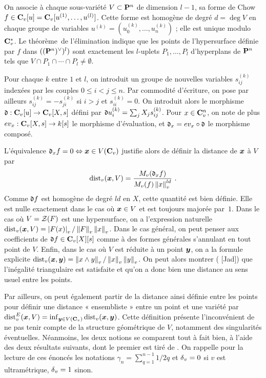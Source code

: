 \documentclass{mpg-preth}
\begin{document}
On associe à chaque sous-variété $V \subset \mathbf{P}^n$ de dimension $l-1$, sa
forme de Chow $f \in \mathbf{C}_v[u] = \mathbf{C}_v[u^{(1)}, \dots, u^{(l)}]$. Cette forme est
homogène de degré $d = \deg V$ en chaque groupe de variables $u^{(k)} =
(u^{(k)}_0, \dots, u^{(k)}_n)$ ; elle est unique modulo $\mathbf{C}_v^{*}$. Le
théorème~de l'élimination indique que les points de l'hypersurface définie par
$f$ dans $((\mathbf{P}^n)^\vee)^l)$ sont exactement les $l$-uplets $P_1, \dots,
P_l$ d'hyperplans de $\mathbf{P}^n$ tels que $V \cap P_1 \cap \cdots \cap P_l \neq
\emptyset$.

Pour chaque $k$ entre $1$ et $l$, on introduit un groupe de nouvelles
variables $s^{(k)}_{ij}$ indexées par les couples $0 \le i < j \le n$. Par
commodité d'écriture, on pose par ailleurs $s^{(k)}_{ij} = - s^{(k)}_{ji}$ si
$i > j$ et $s^{(k)}_{ii} = 0$. On introduit alors le morphisme $\mathfrak{d} : \mathbf{C}_v[u]
\to \mathbf{C}_v[X, s]$ défini par $\mathfrak{d} u^{(k)}_i = \sum_j X_j s^{(k)}_{ij}$. Pour $x
\in \mathbf{C}_v^n$, on note de plus $ev_x : \mathbf{C}_v[X, s] \to k[s]$ le morphisme
d'évaluation, et $\mathfrak{d}_x = ev_x \circ \mathfrak{d}$ le morphisme composé.

L'équivalence $\mathfrak{d}_x f = 0 \Leftrightarrow \boldsymbol{x} \in V(\mathbf{C}_v)$ justifie alors de
définir la distance de $\boldsymbol{x}$ à $V$ par
\[
  \mathrm{dist}_v(\boldsymbol{x}, V) = \frac{M_v(\mathfrak{d}_x f)}{M_v(f) \left\lVert x\right\rVert_{v} ^{ld}} \text{ .}
\]
Comme $\mathfrak{d} f$ est homogène de degré $ld$ en $X$, cette quantité est bien
définie. Elle est nulle exactement dans le cas où $\boldsymbol{x} \in V$ et est toujours
majorée par~$1$. Dans le cas où $V = \mathcal Z(F)$ est une hypersurface, on a
l'expression naturelle $\mathrm{dist}_v(\boldsymbol{x}, V) = \left\lvert F(x)\right\rvert_{v} / \left\lVert F\right\rVert_{v} \left\lVert x\right\rVert_{v}$. Dans le cas
général, on peut penser aux coefficients de $\mathfrak{d} f \in \mathbf{C}_v[X][s]$ comme à des
formes générales s'annulant en tout point de $V$. Enfin, dans le cas où $V$
est réduite à un point $\boldsymbol{y}$, on a la formule explicite $\mathrm{dist}_v (\boldsymbol{x}, \boldsymbol{y}) =
\left\lVert x \wedge y\right\rVert_{v} / \left\lVert x\right\rVert_{v} \left\lVert y\right\rVert_{v}$. On peut alors montrer ( [Jad])
que l'inégalité triangulaire est satisfaite et qu'on a donc bien une distance
au sens usuel entre les points.

Par ailleurs, on peut également partir de la distance ainsi définie entre les
points pour définir une distance « ensembliste » entre un point et une variété
par $\mathrm{dist}_v^E(\boldsymbol{x}, V) = \inf_{\boldsymbol{y} \in V(\mathbf{C}_v)} \mathrm{dist}_v(\boldsymbol{x}, \boldsymbol{y})$. Cette
définition présente l'inconvénient de ne pas tenir compte de la structure
géométrique de $V$, notamment des singularités éventuelles. Néanmoins, les
deux notions se comparent tout à fait bien, à l'aide des deux résultats
suivants, dont le premier est tiré de \cite[« Closest point property »
p.~103]{pphdg}. On rappelle pour la lecture de ces énoncés les notations
$\gamma_n = \sum_{q=1}^{n-1} 1/2q$ et ${\delta\smash{_v}} = 0$ si $v$ est ultramétrique, ${\delta\smash{_v}}
= 1$ sinon.
\end{document}
